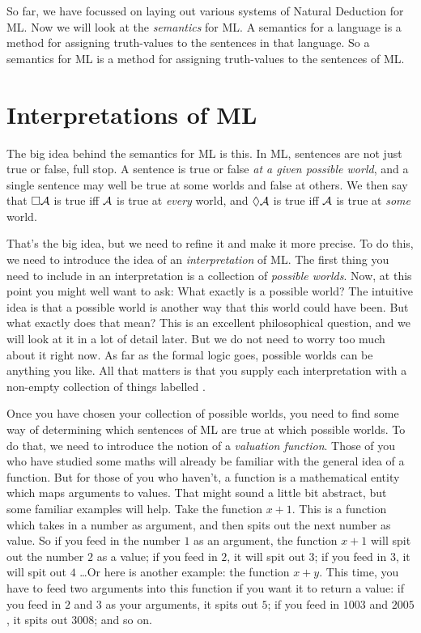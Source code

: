 So far, we have focussed on laying out various systems of Natural Deduction for ML. Now we will look at the \emph{semantics} for ML. A semantics for a language is a method for assigning truth-values to the sentences in that language. So a semantics for ML is a method for assigning truth-values to the sentences of ML.

\section{Interpretations of ML}

The big idea behind the semantics for ML is this. In ML, sentences are not just true or false, full stop. A sentence is true or false \emph{at a given possible world}, and a single sentence may well be true at some worlds and false at others. We then say that $\Box \mathcal{A}$ is true iff $\mathcal{A}$ is true at \emph{every} world, and $\Diamond\mathcal{A}$ is true iff $\mathcal{A}$ is true at \emph{some} world.

That's the big idea, but we need to refine it and make it more precise. To do this, we need to introduce the idea of an \emph{interpretation} of ML. The first thing you need to include in an interpretation is a collection of \emph{possible worlds}. Now, at this point you might well want to ask: What exactly is a possible world? The intuitive idea is that a possible world is another way that this world could have been. But what exactly does that mean? This is an excellent philosophical question, and we will look at it in a lot of detail later. But we do not need to worry too much about it right now. As far as the formal logic goes, possible worlds can be anything you like. All that matters is that you supply each interpretation with a non-empty collection of things labelled .

Once you have chosen your collection of possible worlds, you need to find some way of determining which sentences of ML are true at which possible worlds. To do that, we need to introduce the notion of a \emph{valuation function}. Those of you who have studied some maths will already be familiar with the general idea of a function. But for those of you who haven't, a function is a mathematical entity which maps arguments to values. That might sound a little bit abstract, but some familiar examples will help. Take the function $x+1$. This is a function which takes in a number as argument, and then spits out the next number as value. So if you feed in the number $1$ as an argument, the function $x+1$ will spit out the number $2$ as a value; if you feed in $2$, it will spit out $3$; if you feed in $3$, it will spit out $4$ \dots  Or here is another example: the function $x+y$. This time, you have to feed two arguments into this function if you want it to return a value: if you feed in $2$ and $3$ as your arguments, it spits out $5$; if you feed in $1003$ and $2005$, it spits out $3008$; and so on.

